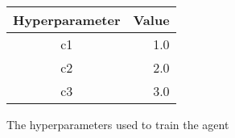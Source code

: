 
\begin{figure}[H]
{\centering
	\begin{tabular}{| c | r |}
		\hline
	
		\textbf{Hyperparameter} & \textbf{Value} \\ \hline
		c1 & 1.0 \\ \hline
		c2 & 2.0 \\ \hline
		c3 & 3.0 \\ \hline
	
	\end{tabular}
	\caption{The hyperparameters used to train the agent}
	\label{fig:neat-hyper}
}
\end{figure}
